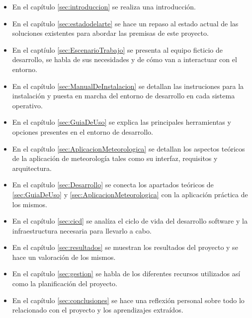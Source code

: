 \begin{itemize}
\item En el capítulo \ref{sec:introduccion} se realiza una introducción.
\item En el capítulo \ref{sec:estadodelarte} se hace un repaso al estado actual de las
soluciones existentes para abordar las premisas de este proyecto.
\item En el captíulo \ref{sec:EscenarioTrabajo} se presenta al equipo ficticio de
desarrollo, se habla de sus necesidades y de cómo van a interactuar con el entorno.
\item En el capítulo \ref{sec:ManualDeInstalacion} se detallan las instruciones para la
instalación y puesta en marcha del entorno de desarrollo en cada sistema operativo.
\item En el capítulo \ref{sec:GuiaDeUso} se explica las principales herramientas y
opciones presentes en el entorno de desarrollo.
\item En el capítulo \ref{sec:AplicacionMeteorologica} se detallan los aspectos teóricos
de la aplicación de meteorología tales como su interfaz, requisitos y arquitectura.
\item En el capítulo \ref{sec:Desarrollo} se conecta los apartados teóricos de \ref{sec:GuiaDeUso}
y \ref{sec:AplicacionMeteorologica} con la aplicación práctica de los mismos.
\item En el capítulo \ref{sec:cicd} se analíza el ciclo de vida del desarrollo software
y la infraestructura necesaria para llevarlo a cabo.
\item En el capítulo \ref{sec:resultados} se muestran los resultados del proyecto y se
hace un valoración de los mismos.
\item En el capítulo \ref{sec:gestion} se habla de los diferentes recursos utilizados
así como la planificación del proyecto.
\item En el capítulo \ref{sec:conclusiones} se hace una reflexión personal sobre todo
lo relacionado con el proyecto y los aprendizajes extraídos.
\end{itemize}

